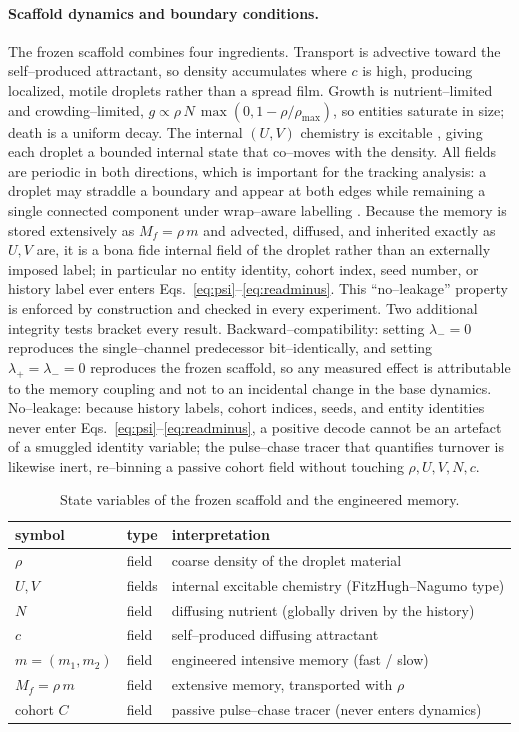 \documentclass[11pt]{article}
\begin{document}
\paragraph{Scaffold dynamics and boundary conditions.} The frozen scaffold combines four ingredients. Transport is
advective toward the self--produced attractant, so density accumulates where $c$ is high, producing localized,
motile droplets rather than a spread film. Growth is nutrient--limited and crowding--limited, $g\propto \rho\,N\,
\max(0,1-\rho/\rho_{\max})$, so entities saturate in size; death is a uniform decay. The internal $(U,V)$ chemistry
is excitable \citep{fitzhugh1961,nagumo1962}, giving each droplet a bounded internal state that co--moves with the
density. All fields are periodic in both directions, which is important for the tracking analysis: a droplet may
straddle a boundary and appear at both edges while remaining a single connected component under wrap--aware
labelling \citep{rosenfeld1966}. Because the memory is stored extensively as $M_f=\rho\,m$ and advected, diffused,
and inherited exactly as $U,V$ are, it is a bona fide internal field of the droplet rather than an externally
imposed label; in particular no entity identity, cohort index, seed number, or history label ever enters
Eqs.~\eqref{eq:psi}--\eqref{eq:readminus}. This ``no--leakage'' property is enforced by construction and checked in
every experiment. Two additional integrity tests bracket every result. Backward--compatibility: setting $\lambda_-=0$ reproduces the single--channel predecessor bit--identically, and setting $\lambda_+=\lambda_-=0$ reproduces the frozen scaffold, so any measured effect is attributable to the memory coupling and not to an incidental change in the base dynamics. No--leakage: because history labels, cohort indices, seeds, and entity identities never enter Eqs.~\eqref{eq:psi}--\eqref{eq:readminus}, a positive decode cannot be an artefact of a smuggled identity variable; the pulse--chase tracer that quantifies turnover is likewise inert, re--binning a passive cohort field without touching $\rho,U,V,N,c$.
\begin{table}[t]\centering\small
\caption{State variables of the frozen scaffold and the engineered memory.}
\label{tab:state}
\begin{tabular}{@{}lll@{}}\toprule
symbol & type & interpretation\\\midrule
$\rho$ & field & coarse density of the droplet material\\
$U,V$ & fields & internal excitable chemistry (FitzHugh--Nagumo type)\\
$N$ & field & diffusing nutrient (globally driven by the history)\\
$c$ & field & self--produced diffusing attractant\\
$m=(m_1,m_2)$ & field & engineered intensive memory (fast / slow)\\
$M_f=\rho\,m$ & field & extensive memory, transported with $\rho$\\
cohort $C$ & field & passive pulse--chase tracer (never enters dynamics)\\\bottomrule
\end{tabular}
\end{table}
\end{document}

